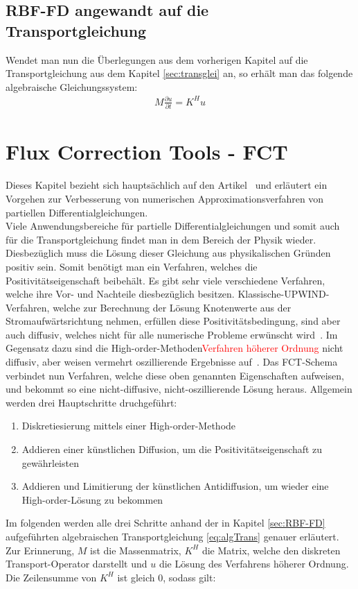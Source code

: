 \documentclass[a4paper,11pt]{article}
\newcommand{\col}[2][red]{\textcolor{#1}{#2}}
\begin{document}
\subsection{RBF-FD angewandt auf die Transportgleichung}
Wendet man nun die Überlegungen aus dem vorherigen Kapitel auf die Transportgleichung aus dem Kapitel \ref{sec:transglei} an, so erhält man das folgende algebraische Gleichungssystem:
\begin{align}
 M\frac{\partial u}{\partial t}=K^Hu\label{eq:algTrans}
\end{align}
\pagebreak
\section{Flux Correction Tools - FCT}
Dieses Kapitel bezieht sich hauptsächlich auf den Artikel~\cite{kuzmin2002flux} und erläutert ein Vorgehen zur Verbesserung von numerischen Approximationsverfahren von partiellen Differentialgleichungen.\\
Viele Anwendungsbereiche für partielle Differentialgleichungen und somit auch für die Transportgleichung findet man in dem Bereich der Physik wieder. Diesbezüglich muss die Lösung dieser Gleichung aus physikalischen Gründen positiv sein. Somit benötigt man ein Verfahren, welches die Positivitätseigenschaft beibehält. Es gibt sehr viele verschiedene Verfahren, welche ihre Vor- und Nachteile diesbezüglich besitzen. Klassische-UPWIND-Verfahren, welche zur Berechnung der Lösung Knotenwerte aus der Stromaufwärtsrichtung nehmen, erfüllen diese Positivitätsbedingung, sind aber auch diffusiv, welches nicht für alle numerische Probleme erwünscht wird~\cite{kuzmin2002flux}. Im Gegensatz dazu sind die High-order-Methoden\col{Verfahren höherer Ordnung} nicht diffusiv, aber weisen vermehrt oszillierende Ergebnisse auf~\cite{kuzmin2002flux}. Das FCT-Schema verbindet nun Verfahren, welche diese oben genannten Eigenschaften aufweisen, und bekommt so eine nicht-diffusive, nicht-oszillierende Lösung heraus. Allgemein werden drei Hauptschritte druchgeführt:
\begin{enumerate}
 \item Diskretiesierung mittels einer High-order-Methode
 \item Addieren einer künstlichen Diffusion, um die Positivitätseigenschaft zu gewährleisten
 \item  Addieren und Limitierung der künstlichen Antidiffusion, um wieder eine High-order-Lösung zu bekommen
\end{enumerate}
Im folgenden werden alle drei Schritte anhand der in Kapitel \ref{sec:RBF-FD} aufgeführten algebraischen Transportgleichung \eqref{eq:algTrans} genauer erläutert. Zur Erinnerung, $M$ ist die Massenmatrix, $K^H$ die Matrix, welche den diskreten Transport-Operator darstellt und $u$ die Lösung des Verfahrens höherer Ordnung. Die Zeilensumme von $K^H$ ist gleich 0, sodass gilt:
\end{document}
